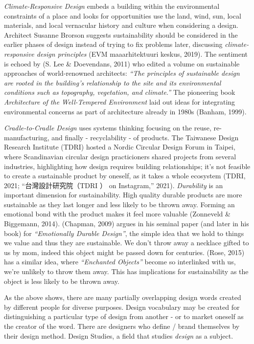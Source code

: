 \documentclass[
  12pt,
  letterpaper,
  DIV=11,
  numbers=noendperiod]{scrartcl}
\begin{document}
\emph{Climate-Responsive Design} embeds a building within the
environmental constraints of a place and looks for opportunities use the
land, wind, sun, local materials, and local vernacular history and
culture when considering a design. Architect Susanne Brorson suggests
sustainability should be considered in the earlier phases of design
instead of trying to fix problems later, discussing
\emph{climate-responsive design principles} (EVM maaarhitektuuri keskus,
2019). The sentiment is echoed by (S. Lee \& Doevendans, 2011) who
edited a volume on sustainable approaches of world-renowned architects:
\emph{``The principles of sustainable design are rooted in the
building's relationship to the site and its environmental conditions
such as topography, vegetation, and climate.''} The pioneering book
\emph{Architecture of the Well-Tempered Environment} laid out ideas for
integrating environmental concerns as part of architecture already in
1980s (Banham, 1999).

\emph{Cradle-to-Cradle Design} uses systems thinking focusing on the
reuse, re-manufacturing, and finally - recyclability - of products. The
Taiwanese Design Research Institute (TDRI) hosted a Nordic Circular
Design Forum in Taipei, where Scandinavian circular design practicioners
shared projects from several industries, highlighting how design
requires building relationships; it's not feasible to create a
sustainable product by oneself, as it takes a whole ecosystem (TDRI,
2021; {``台灣設計研究院（{TDRI} ） on {Instagram},''} 2021).
\emph{Durability} is an important dimension for sustainability. High
quality durable products are more sustainable as they last longer and
less likely to be thrown away. Forming an emotional bond with the
product makes it feel more valuable (Zonneveld \& Biggemann, 2014).
(Chapman, 2009) argues in his seminal paper (and later in his book) for
\emph{``Emotionally Durable Design''}, the simple idea that we hold to
things we value and thus they are sustainable. We don't throw away a
necklace gifted to us by mom, indeed this object might be passed down
for centuries. (Rose, 2015) has a similar idea, where \emph{``Enchanted
Objects''} become so interlinked with us, we're unlikely to throw them
away. This has implications for sustainability as the object is less
likely to be thrown away.

As the above shows, there are many partially overlapping design words
created by different people for diverse purposes. Design vocabulary may
be created for distinguishing a particular type of design from another -
or to market oneself as the creator of the word. There are designers who
define / brand themselves by their design method. Design Studies, a
field that studies \emph{design} as a subject.
\end{document}

